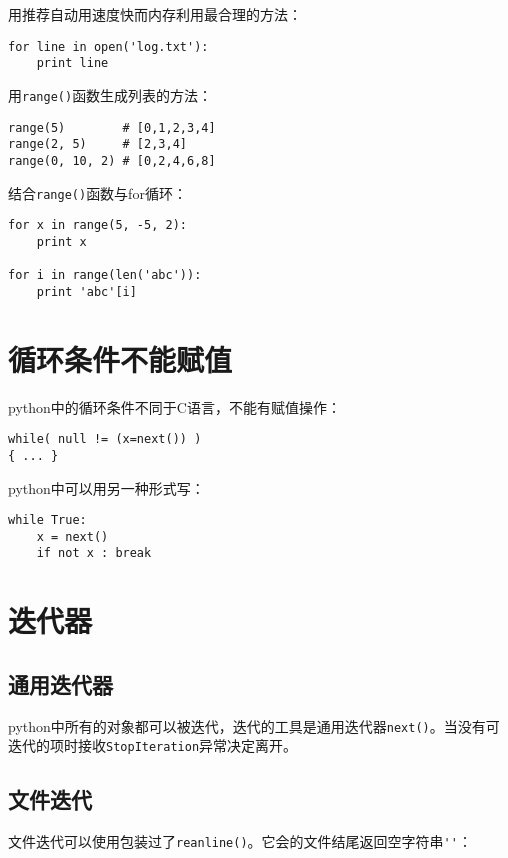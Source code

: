 用推荐自动用速度快而内存利用最合理的方法：

\begin{lstlisting}
for line in open('log.txt'):
	print line
\end{lstlisting}

用\verb|range()|函数生成列表的方法：

\begin{lstlisting}
range(5)        # [0,1,2,3,4]
range(2, 5)     # [2,3,4]
range(0, 10, 2) # [0,2,4,6,8]
\end{lstlisting}

结合\verb|range()|函数与for循环：

\begin{lstlisting}
for x in range(5, -5, 2):
	print x

for i in range(len('abc')):
	print 'abc'[i]
\end{lstlisting}

\section{循环条件不能赋值}

python中的循环条件不同于C语言，不能有赋值操作：

\begin{lstlisting}
while( null != (x=next()) )
{ ... }
\end{lstlisting}

python中可以用另一种形式写：

\begin{lstlisting}
while True:
	x = next()
	if not x : break
\end{lstlisting}

\section{迭代器}

\subsection{通用迭代器}

python中所有的对象都可以被迭代，迭代的工具是通用迭代器\verb|next()|。当没有可迭代的项时接收\verb|StopIteration|异常决定离开。

\subsection{文件迭代}

文件迭代可以使用包装过了\verb|reanline()|。它会的文件结尾返回空字符串\verb|''|：

